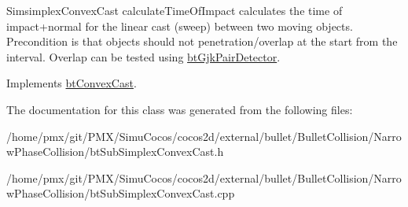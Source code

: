 Simsimplex\+Convex\+Cast calculate\+Time\+Of\+Impact calculates the time of impact+normal for the linear cast (sweep) between two moving objects. Precondition is that objects should not penetration/overlap at the start from the interval. Overlap can be tested using \hyperlink{classbtGjkPairDetector}{bt\+Gjk\+Pair\+Detector}. 

Implements \hyperlink{classbtConvexCast_abaf0f25a8cccfcafdaabada83c8d2bfb}{bt\+Convex\+Cast}.



The documentation for this class was generated from the following files\+:\begin{DoxyCompactItemize}
\item 
/home/pmx/git/\+P\+M\+X/\+Simu\+Cocos/cocos2d/external/bullet/\+Bullet\+Collision/\+Narrow\+Phase\+Collision/bt\+Sub\+Simplex\+Convex\+Cast.\+h\item 
/home/pmx/git/\+P\+M\+X/\+Simu\+Cocos/cocos2d/external/bullet/\+Bullet\+Collision/\+Narrow\+Phase\+Collision/bt\+Sub\+Simplex\+Convex\+Cast.\+cpp\end{DoxyCompactItemize}
